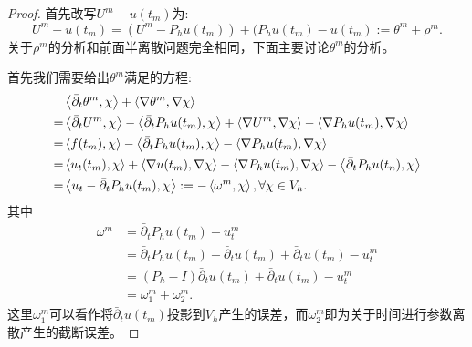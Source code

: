 \begin{proof}
    首先改写$U^{m}-u(t_{m})$为:
    \begin{equation}
        U^{m}-u(t_{m})=(U^{m}-P_{h}u(t_{m}))+(P_{h}u(t_{m})-u(t_{m}):=\theta^{m}+\rho^{m}.
    \end{equation}
    关于$\rho^{m}$的分析和前面半离散问题完全相同，下面主要讨论$\theta^{m}$的分析。

    首先我们需要给出$\theta^{m}$满足的方程:
    \begin{equation}
        \label{eq:aux_theta}
        \begin{aligned}
            &\left<\bar{\partial}_{t}\theta^{m},\chi\right>+\left<\nabla\theta^{m},\nabla\chi\right>\\
            =&\left<\bar{\partial}_{t}U^{m},\chi\right>-\left<\bar{\partial}_{t}P_{h}u(t_{m}),\chi\right>+\left<\nabla U^{m},\nabla\chi\right>-\left<\nabla P_{h}u(t_{m}),\nabla\chi\right>\\
            =&\left<f(t_{m}),\chi\right>-\left<\bar{\partial}_{t}P_{h}u(t_{m}),\chi\right>-\left<\nabla P_{h}u(t_{m}),\nabla \chi\right>\\
            =&\left<u_{t}(t_{m}),\chi\right>+\left<\nabla u(t_{m}),\nabla\chi\right>-\left<\nabla P_{h}u(t_{m}),\nabla\chi\right>-\left<\bar{\partial}_{t}P_{h}u(t_{n}),\chi\right>\\
            =&\left<u_{t}-\bar{\partial}_{t}P_{h}u(t_{m}),\chi\right>:=-\left<\omega^{m},\chi\right>,\forall\chi\in V_{h}.
        \end{aligned}
    \end{equation}
    其中
    \begin{equation}
        \begin{aligned}
            \omega^{m}&=\bar{\partial}_{t}P_{h}u(t_{m})-u_{t}^{m}\\
            &=\bar{\partial}_{t}P_{h}u(t_{m})-\bar{\partial}_{t}u(t_{m})+\bar{\partial}_{t}u(t_{m})-u_{t}^{m}\\
            &=(P_{h}-I)\bar{\partial}_{t}u(t_{m})+\bar{\partial}_{t}u(t_{m})-u_{t}^{m}\\
            &=\omega_{1}^{m}+\omega_{2}^{m}.
        \end{aligned}
    \end{equation}
    这里$\omega_{1}^{m}$可以看作将$\bar{\partial}_{t}u(t_{m})$投影到$V_{h}$产生的误差，而$\omega_{2}^{m}$即为关于时间进行参数离散产生的截断误差。
    

\end{proof}
